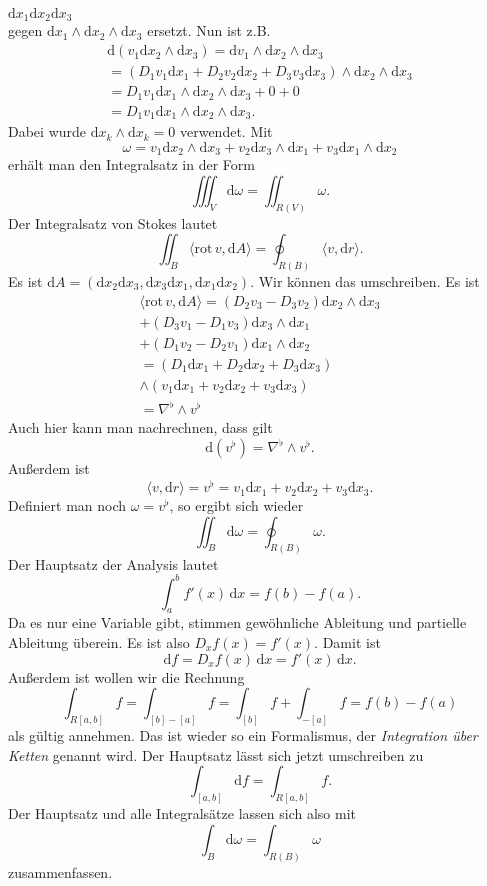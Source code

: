 \documentclass[a4paper,10pt,fleqn,twocolumn,twoside]{article}
\begin{document}
\(\mathrm dx_1\mathrm dx_2\mathrm dx_3\)\\
gegen \(\mathrm dx_1\wedge\mathrm dx_2\wedge\mathrm dx_3\)
ersetzt. Nun ist z.B.
\begin{gather*}\mathrm d(v_1\mathrm dx_2\wedge\mathrm dx_3)
= \mathrm dv_1\wedge\mathrm dx_2\wedge\mathrm dx_3\\
= (D_1v_1\mathrm dx_1+D_2v_2\mathrm dx_2+D_3v_3\mathrm dx_3)
\wedge\mathrm dx_2\wedge\mathrm dx_3\\
= D_1v_1\mathrm dx_1\wedge\mathrm dx_2\wedge\mathrm dx_3+0+0\\
= D_1v_1\mathrm dx_1\wedge\mathrm dx_2\wedge\mathrm dx_3.
\end{gather*}
Dabei wurde \(\mathrm dx_k\wedge\mathrm dx_k=0\) verwendet.
Mit
\[\omega = v_1\mathrm dx_2\wedge\mathrm dx_3
+v_2\mathrm dx_3\wedge\mathrm dx_1
+v_3\mathrm dx_1\wedge\mathrm dx_2\]
erhält man den Integralsatz in der Form
\[\iiint_V \mathrm d\omega = \iint_{R(V)} \omega.\]
Der Integralsatz von Stokes lautet
\[\iint_B \langle\mathrm{rot}\,v,\mathrm dA\rangle
= \oint_{R(B)} \langle v,\mathrm dr\rangle.\]
Es ist
\(\mathrm dA = (\mathrm dx_2\mathrm dx_3,\mathrm dx_3\mathrm dx_1,
\mathrm dx_1\mathrm dx_2)\).
Wir können das umschreiben. Es ist
\begin{gather*}
\langle\mathrm{rot}\,v,\mathrm dA\rangle
= (D_2v_3-D_3v_2)\mathrm dx_2\wedge\mathrm dx_3\\
+ (D_3v_1-D_1v_3)\mathrm dx_3\wedge\mathrm dx_1\\
+ (D_1v_2-D_2v_1)\mathrm dx_1\wedge\mathrm dx_2\\
= (D_1\mathrm dx_1+D_2\mathrm dx_2+D_3\mathrm dx_3)\\
\wedge (v_1\mathrm dx_1+v_2\mathrm dx_2+v_3\mathrm dx_3)\\
= \nabla^\flat\wedge v^\flat
\end{gather*}
Auch hier kann man nachrechnen, dass gilt
\[\mathrm d(v^\flat) = \nabla^\flat\wedge v^\flat.\]
Außerdem ist
\[\langle v,\mathrm dr\rangle = v^\flat
= v_1\mathrm dx_1+v_2\mathrm dx_2+v_3\mathrm dx_3.\]
Definiert man noch \(\omega = v^\flat\), so ergibt sich wieder
\[\iint_B \mathrm d\omega = \oint_{R(B)}\omega.\]
%
Der Hauptsatz der Analysis lautet
\[\int_a^b f'(x)\,\mathrm dx = f(b)-f(a).\]
Da es nur eine Variable gibt, stimmen gewöhnliche Ableitung und
partielle Ableitung überein. Es ist also \(D_x f(x) = f'(x)\).
%
Damit ist
\[\mathrm df = D_x f(x)\,\mathrm dx = f'(x)\,\mathrm dx.\]
%
Außerdem ist wollen wir die Rechnung
\[\int_{R[a,b]} f = \int_{[b]-[a]}f = \int_{[b]} f + \int_{-[a]} f
= f(b)-f(a)\]
als gültig annehmen. Das ist wieder so ein Formalismus, der
\textit{Integration über Ketten} genannt wird.
%
Der Hauptsatz lässt sich jetzt umschreiben zu
\[\int_{[a,b]} \mathrm df = \int_{R[a,b]}f.\]
Der Hauptsatz und alle Integralsätze lassen sich also mit
\[\int_B \mathrm d\omega = \int_{R(B)}\omega\]
zusammenfassen.
\end{document}
